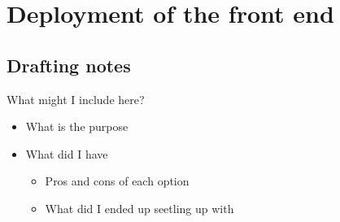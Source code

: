 \section{Deployment of the front end}
\subsection{Drafting notes}
What might I include here?
\begin{itemize}
    \item What is the purpose
    \item What did I have
    \begin{itemize}
        \item Pros and cons of each option
        \item What did I ended up seetling up with
    \end{itemize}
\end{itemize}
